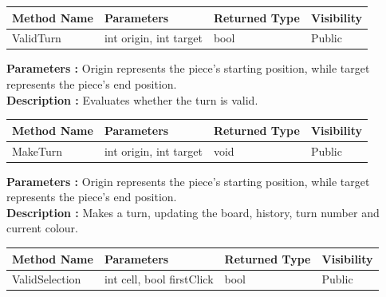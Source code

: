\documentclass[12pt]{article}
\begin{document}
\begin{table}[H]
    \begin{tabular}{|l|l|l|l|}
    \hline
    \rowcolor[HTML]{EFEFEF} 
    \cellcolor[HTML]{EFEFEF}\textbf{Method Name} & \textbf{Parameters}    & \textbf{Returned Type} & \textbf{Visibility} \\ \hline
    ValidTurn                                    & int origin, int target & bool                   & Public              \\ \hline
    \end{tabular}
\end{table}

\textbf{Parameters :} Origin represents the piece's starting position, while target represents the piece's end position. 
\\

\textbf{Description :} Evaluates whether the turn is valid.  

\begin{table}[H]
    \begin{tabular}{|l|l|l|l|}
    \hline
    \rowcolor[HTML]{EFEFEF} 
    \cellcolor[HTML]{EFEFEF}\textbf{Method Name} & \textbf{Parameters}    & \textbf{Returned Type} & \textbf{Visibility} \\ \hline
    MakeTurn                                     & int origin, int target & void                   & Public              \\ \hline
    \end{tabular}
\end{table}

\textbf{Parameters :} Origin represents the piece's starting position, while target represents the piece's end position.  
\\

\textbf{Description :} Makes a turn, updating the board, history, turn number and current colour. 

\begin{table}[H]
    \begin{tabular}{|l|l|l|l|}
    \hline
    \rowcolor[HTML]{EFEFEF} 
    \cellcolor[HTML]{EFEFEF}\textbf{Method Name} & \textbf{Parameters}       & \textbf{Returned Type} & \textbf{Visibility} \\ \hline
    ValidSelection                               & int cell, bool firstClick & bool                   & Public              \\ \hline
    \end{tabular}
\end{table}
\end{document}
